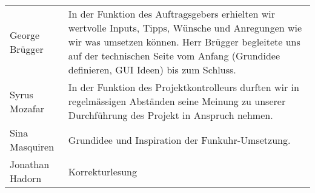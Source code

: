 \begin{tabular}{p{3cm} p{10cm}}
George Brügger & In der Funktion des Auftragsgebers erhielten wir wertvolle Inputs, Tipps, Wünsche und Anregungen wie wir was umsetzen können. Herr Brügger begleitete uns auf der technischen Seite vom Anfang (Grundidee definieren, GUI Ideen) bis zum Schluss.\\
Syrus Mozafar & In der Funktion des Projektkontrolleurs durften wir in regelmässigen Abständen seine Meinung zu unserer Durchführung des Projekt in Anspruch nehmen.\\
Sina Masquiren & Grundidee und Inspiration der Funkuhr-Umsetzung.\\
Jonathan Hadorn & Korrekturlesung\\
\end{tabular}
